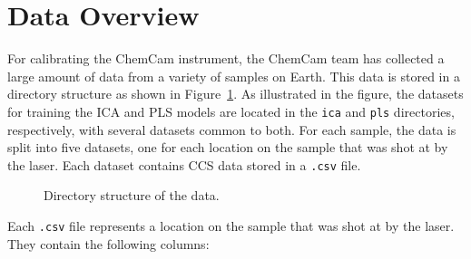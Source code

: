 \section{Data Overview}\label{sec:data_overview}
For calibrating the ChemCam instrument, the ChemCam team has collected a large amount of data from a variety of samples on Earth\cite{wiensPreFlight3}.
This data is stored in a directory structure as shown in Figure~\ref{fig:directory_structure}.
As illustrated in the figure, the datasets for training the ICA and PLS models are located in the \texttt{ica} and \texttt{pls} directories, respectively, with several datasets common to both.
For each sample, the data is split into five datasets, one for each location on the sample that was shot at by the laser.
Each dataset contains CCS data stored in a \texttt{.csv} file.

\begin{figure}[ht]
\caption{Directory structure of the data.}
\label{fig:directory_structure}
\end{figure}

Each \texttt{.csv} file represents a location on the sample that was shot at by the laser.
They contain the following columns:

